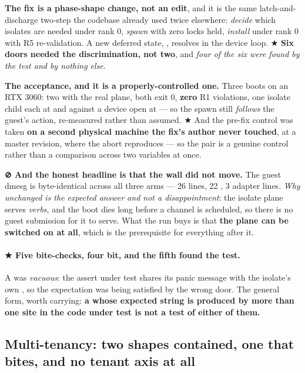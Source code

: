 \documentclass[10.5pt]{article}
\begin{document}
\textbf{The fix is a phase-shape change, not an edit}, and it is the same latch-and-discharge
two-step the codebase already used twice elsewhere: \emph{decide} which isolates are needed under
rank 0, \emph{spawn} with zero locks held, \emph{install} under rank 0 with R5 re-validation. A
new deferred state, , resolves in the device loop. ★ \textbf{Six doors needed
the discrimination, not two}, and \emph{four of the six were found by the test and by nothing
else}.

\textbf{The acceptance, and it is a properly-controlled one.} Three boots on an RTX 3060: two
with the real plane, both exit 0, \textbf{zero} R1 violations, one isolate child each at
 and  against a device open at  — so the spawn still
\emph{follows} the guest's action, re-measured rather than assumed. ★ And the pre-fix control was
taken \textbf{on a second physical machine the fix's author never touched}, at a master revision,
where the abort reproduces — so the pair is a genuine control rather than a comparison across two
variables at once.

\textbf{⊘ And the honest headline is that the wall did not move.} The guest dmesg is byte-identical
across all three arms — 26 lines, 22 , 3 adapter lines. \emph{Why unchanged is the
expected answer and not a disappointment}: the isolate plane serves \emph{verbs}, and the boot
dies long before a channel is scheduled, so there is no guest submission for it to serve. What
the run buys is that \textbf{the plane can be switched on at all}, which is the prerequisite for
everything after it.

\paragraph{★ Five bite-checks, four bit, and the fifth found the test.} A
\code{\#[should\_panic(expected = "R1 no-blocking-under-lock")]} was \emph{vacuous}: the assert
under test shares its panic message with the isolate's own , so the expectation was
being satisfied by the wrong door. The general form, worth carrying: \textbf{a
 whose expected string is produced by more than one site in the code under
test is not a test of either of them.}

\subsection{\texorpdfstring{Multi-tenancy: two shapes contained, one that bites, and no tenant axis at all}{Multi-tenancy: two shapes contained, one that bites, and no tenant axis at all}}
\label{sec:multitenant}
\end{document}
